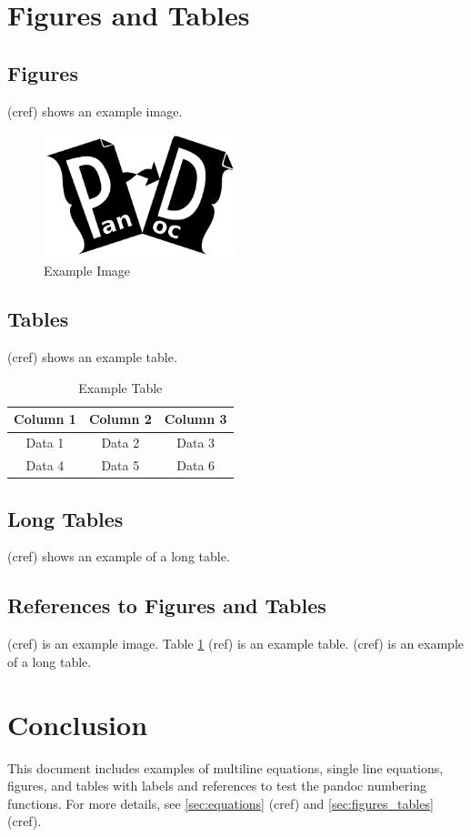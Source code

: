 \documentclass{article}
\begin{document}
\section{Figures and Tables\label{sec:figures_tables}}

\subsection{Figures}
 (cref) shows an example image.

\begin{figure}[H]
    \centering
    \includegraphics[width=0.5\textwidth]{./example-image}
    \caption{Example Image}
    \label{fig:example}
\end{figure}

\subsection{Tables}
 (cref) shows an example table.

\begin{table}[H]
    \centering
    \begin{tabular}{|c|c|c|}
        \hline
        Column 1 & Column 2 & Column 3 \\
        \hline
        Data 1 & Data 2 & Data 3 \\
        Data 4 & Data 5 & Data 6 \\
        \hline
    \end{tabular}
    \caption{Example Table}
    \label{tab:example}
\end{table}

\subsection{Long Tables}
 (cref) shows an example of a long table.


\subsection{References to Figures and Tables}
 (cref) is an example image. Table \ref{tab:example} (ref) is an example table.  (cref) is an example of a long table.

\section{Conclusion}
This document includes examples of multiline equations, single line equations, figures, and tables with labels and references to test the pandoc numbering functions. For more details, see \cref{sec:equations} (cref) and \cref{sec:figures_tables} (cref).
\end{document}
